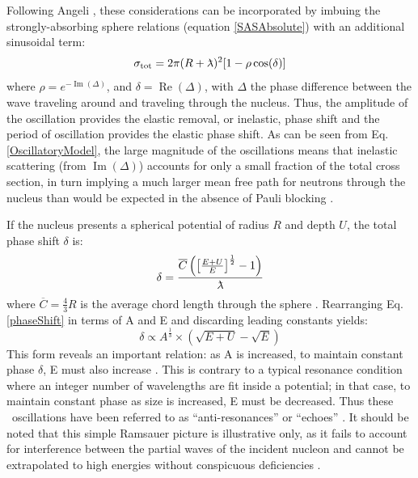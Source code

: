Following Angeli \cite{Angeli1970}, these considerations can be incorporated by
imbuing the strongly-absorbing sphere relations (equation \ref{SASAbsolute}) with an additional sinusoidal term:
\begin{equation} \label{OscillatoryModel}
    \tot = 2\pi (R+\lambdabar)^{2}[1 - \rho \cos(\delta)]
\end{equation}
where $\rho = e^{-\operatorname{Im}(\Delta)}$, and $\delta =
\operatorname{Re}(\Delta)$, with $\Delta$ the phase difference between the wave traveling
around and traveling through the nucleus. Thus, the amplitude of the oscillation provides the 
elastic removal, or inelastic, phase shift and the period of oscillation
provides the elastic phase shift.
As can be seen from Eq. \ref{OscillatoryModel}, the large magnitude of the oscillations means that 
inelastic scattering (from $\operatorname{Im}(\Delta)$) accounts for only a small fraction of the 
total cross section, in turn implying a much larger mean free path for neutrons through the nucleus 
than would be expected in the absence of Pauli blocking \cite{Mohr1955}.

If the nucleus presents a spherical potential of radius $R$ and depth $U$, the total phase shift $\delta$ is:
\begin{equation} \label{phaseShift}
    \delta =
    \frac{\overline{C}\left(\left[{\frac{E+U}{E}}\right]^{\frac{1}{2}}-1\right)}{\lambdabar}
\end{equation}
where $\overline{C} = \frac{4}{3}R$ is the average chord length through the
sphere \cite{Angeli1970}. Rearranging Eq. \ref{phaseShift} in terms of A and E and
discarding leading constants yields:
\begin{equation}
    \delta \propto A^{\frac{1}{3}}\times\left(\sqrt{E+U}-\sqrt{E}\right)
\end{equation}
This form reveals an important relation: as A is increased, to maintain constant 
phase $\delta$, E must also increase \cite{Satchler1980, Peterson1962}. 
This is contrary to a typical resonance condition where an integer number of wavelengths
are fit inside a potential; in that case, to maintain constant phase as size is increased,
E must be decreased. Thus these \tot\ oscillations have been referred to as
``anti-resonances'' or ``echoes'' \cite{Satchler1980, McVoy1967}. It should be
noted that this simple Ramsauer picture is illustrative only, as it fails to
account for interference between the partial waves of the incident nucleon and
cannot be extrapolated to high energies without conspicuous deficiencies
\cite{Ahmad1973}.

